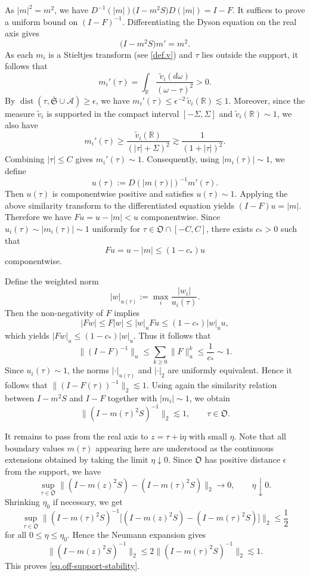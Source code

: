 \documentclass[11pt,twoside, a4paper]{article}
\numberwithin{equation}{section}
\numberwithin{figure}{section}
\theoremstyle{plain} %
\theoremstyle{definition}
\theoremstyle{remark}
\newcommand{\1} {\mspace{1 mu}}
\newcommand{\2} {\mspace{2 mu}}
\DeclareMathOperator{\dist}{dist}
\begin{document}
As $|m|^2=m^2$, we have
$
    D^{-1}(|m|)\bigl(I-m^2S\bigr)D(|m|)
    =
    I-F.
$
It suffices to prove a uniform bound on \((I-F)^{-1}\).
Differentiating the Dyson equation on the real axis gives
\[
    \bigl(I-m^2S\bigr)m'=m^2 .
\]
As each \(m_i\) is a Stieltjes transform (see \eqref{def.v}) and \(\tau\) lies outside the support, it follows that
\[
    m_i'(\tau)
    =
    \int_{\mathbb R}\frac{\tilde v_i(d\omega)}{(\omega-\tau)^2}
    >0 .
\]
By \(\dist(\tau,\overline{\mathfrak S}\cup\mathcal{A})\ge \epsilon\), we have
$
    m_i'(\tau)
    \le
    \epsilon^{-2}\,\widetilde v_i(\mathbb R)
    \lesssim1 .
$
Moreover, since the measure $\widetilde{v}_i$ is supported in the compact interval \([-\Sigma,\Sigma]\) and
\(\widetilde v_i(\mathbb R)\sim1\), we also have
\[
    m_i'(\tau)
    \ge
    \frac{\widetilde v_i(\mathbb R)}{(|\tau|+\Sigma)^2}
    \gtrsim
    \frac1{(1+|\tau|)^2}.
\]
Combining $|\tau|\le C$ gives $m_i'(\tau)\sim 1$.
Consequently, using $|m_i(\tau)|\sim 1$, we define
\[
    u(\tau):=D(|m(\tau)|)^{-1}m'(\tau).
\]
Then $u(\tau)$ is componentwise positive and satisfies
$
 u(\tau)\sim 1.
$
Applying the above similarity transform to the differentiated equation yields
$
    (I-F)u=|m| .
$
Therefore we have
$
    Fu=u-|m|<u
$
componentwise. 
Since \(u_i(\tau)\sim|m_i(\tau)|\sim1\) uniformly for \(\tau\in\mathfrak O\cap[-C,C]\), there exists \(c_*>0\) such that
\[
    Fu=u-|m|\le (1-c_*)u
\]
componentwise.

Define the weighted norm
\[
    |w|_{u(\tau)}:=\max_i\frac{|w_i|}{u_i(\tau)}.
\]
Then the non-negativity of \(F\) implies
\[
    |Fw|
    \le F|w|
    \le |w|_{u}Fu
    \le (1-c_*)|w|_u u,
\]
which yields
$
    |Fw|_{u}
    \le (1-c_*)|w|_{u}
$.
Thus it follows that
\[
    \|(I-F)^{-1}\|_{u}
    \le \sum_{k\ge0}\|F\|^k_{u}
    \le \frac1{c_*}\sim 1.
\]
Since \(u_i(\tau)\sim 1\), the norms \(|\cdot|_{u(\tau)}\) and \(|\cdot|_2\) are
uniformly equivalent. Hence it follows that
$
    \|(I-F(\tau))^{-1}\|_2\lesssim1 .
$
Using again the similarity relation between \(I-m^2S\) and \(I-F\) together with $|m_i|\sim 1$,
we obtain
\[
    \|(I-m(\tau)^2S)^{-1}\|_2\lesssim1,
    \qquad \tau\in\mathfrak O .
\]

It remains to pass from the real axis to \(z=\tau+\mathrm i\eta\) with small
\(\eta\). Note that all boundary values $m(\tau)$ appearing here are understood as the continuous extensions obtained by taking the limit $\eta\downarrow 0$. Since \(\mathfrak O\) has positive distance $\epsilon$ from the support, we have
\[
    \sup_{\tau\in\mathfrak O}
    \bigl\|
        (I-m(z)^2S)
        -
        (I-m(\tau)^2S)
    \bigr\|_2
    \longrightarrow 0,
    \qquad \eta\downarrow0 .
\]
Shrinking \(\eta_0\) if necessary, we get
\[
    \sup_{\tau\in\mathfrak O}
    \bigl\|
        (I-m(\tau)^2S)^{-1}
        \bigl[
            (I-m(z)^2S)
            -
            (I-m(\tau)^2S)
        \bigr]
    \bigr\|_2
    \le \frac12
\]
for all \(0\le\eta\le\eta_0\). Hence the Neumann expansion gives
\[
    \|(I-m(z)^2S)^{-1}\|_2
    \le
    2\|(I-m(\tau)^2S)^{-1}\|_2
    \lesssim1 .
\]
This proves \eqref{eq.off-support-stability}.
\end{document}
